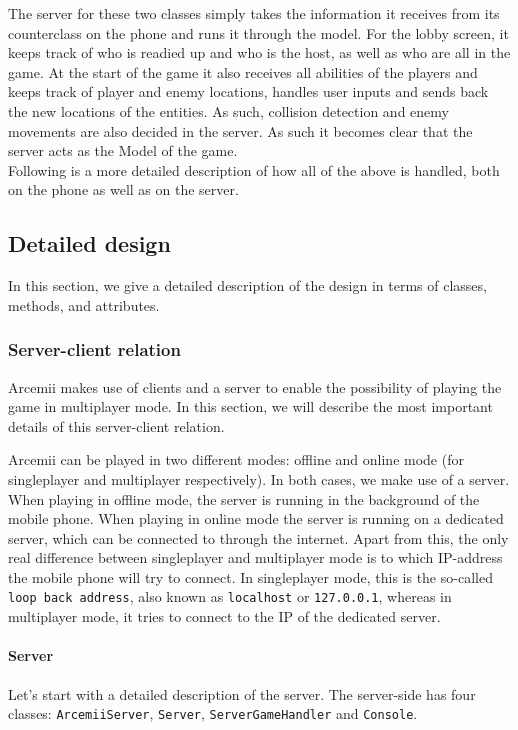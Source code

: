 \documentclass[../main.tex]{subfiles}
\begin{document}
		The server for these two classes simply takes the information it receives from its counterclass on the phone and runs it through the model. For the lobby screen, it keeps track of who is readied up and who is the host, as well as who are all in the game. At the start of the game it also receives all abilities of the players and keeps track of player and enemy locations, handles user inputs and sends back the new locations of the entities. As such, collision detection and enemy movements are also decided in the server. As such it becomes clear that the server acts as the Model of the game. \\
		Following is a more detailed description of how all of the above is handled, both on the phone as well as on the server.
	\pagebreak
	\subsection{Detailed design}
	In this section, we give a detailed description of the design in terms of classes, methods, and attributes.

		\subsubsection{Server-client relation}
		Arcemii makes use of clients and a server to enable the possibility of playing the game in multiplayer mode. In this section, we will describe the most important details of this server-client relation.

		Arcemii can be played in two different modes: offline and online mode (for singleplayer and multiplayer respectively). In both cases, we make use of a server. When playing in offline mode, the server is running in the background of the mobile phone. When playing in online mode the server is running on a dedicated server, which can be connected to through the internet. Apart from this, the only real difference between singleplayer and multiplayer mode is to which IP-address the mobile phone will try to connect. In singleplayer mode, this is the so-called \texttt{loop back address}, also known as \texttt{localhost} or \texttt{127.0.0.1}, whereas in multiplayer mode, it tries to connect to the IP of the dedicated server. 

		\paragraph{Server} 
		Let's start with a detailed description of the server. The server-side has four classes: \texttt{ArcemiiServer}, \texttt{Server}, \texttt{ServerGameHandler} and \texttt{Console}. 
		
\end{document}

